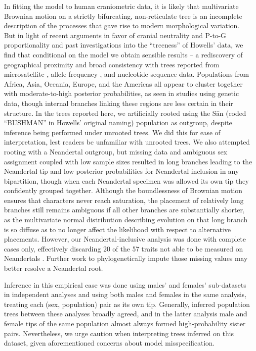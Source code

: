In fitting the model to human craniometric data, it is likely that multivariate Brownian motion on a strictly bifurcating, non-reticulate tree is an incomplete description of the processes that gave rise to modern morphological variation. But in light of recent arguments in favor of cranial neutrality and P-to-G proportionality and past investigations into the “treeness” of Howells’ data, we find that conditional on the model we obtain sensible results – a rediscovery of geographical proximity and broad consistency with trees reported from microsatellite \citep[e.g. ][]{pembertonPopulationStructureComprehensive2013}, allele frequency \citep[e.g. ][]{pickrellInferencePopulationSplits2012}, and nucleotide sequence \citep[e.g. ][]{liWorldwideHumanRelationships2008, mallickSimonsGenomeDiversity2016} data. Populations from Africa, Asia, Oceania, Europe, and the Americas all appear to cluster together with moderate-to-high posterior probabilities, as seen in studies using genetic data, though internal branches linking these regions are less certain in their structure. In the trees reported here, we artificially rooted using the Sān (coded “BUSHMAN” in Howells’ original naming) population as outgroup, despite inference being performed under unrooted trees. We did this for ease of interpretation, lest readers be unfamiliar with unrooted trees. We also attempted rooting with a Neandertal outgroup, but missing data and ambiguous sex assignment coupled with low sample sizes resulted in long branches leading to the Neandertal tip and low posterior probabilities for Neandertal inclusion in any bipartition, though when each Neandertal specimen was allowed its own tip they confidently grouped together. Although the boundlessness of Brownian motion ensures that characters never reach saturation, the placement of relatively long branches still remains ambiguous if all other branches are substantially shorter, as the multivariate normal distribution describing evolution on that long branch is so diffuse as to no longer affect the likelihood with respect to alternative placements. However, our Neandertal-inclusive analysis was done with complete cases only, effectively discarding 20 of the 57 traits not able to be measured on Neandertals \citep{weaverUnconstrainedCranialEvolution2015}. Further work to phylogenetically impute those missing values may better resolve a Neandertal root.

Inference in this empirical case was done using males' and females' sub-datasets in independent analyses and using both males and females in the same analysis, treating each (sex, population) pair as its own tip. Generally, inferred population trees between these analyses broadly agreed, and in the latter analysis male and female tips of the same population almost always formed high-probability sister pairs. Nevertheless, we urge caution when interpreting trees inferred on this dataset, given aforementioned concerns about model misspecification.

